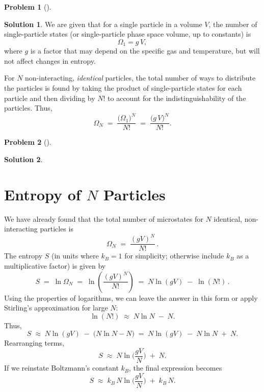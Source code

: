 \documentclass[12pt]{article}
\title{}
\author{Jerich Lee}
\date{\today}
\theoremstyle{definition} %
\newtheorem{solution}{Solution}
\newtheorem{problem}{Problem}
\theoremstyle{plain} %
\begin{document}
\maketitle
\begin{problem}[]
    
\end{problem}
\begin{solution}
   
We are given that for a single particle in a volume \(V\), the number of single-particle states (or single-particle phase space volume, up to constants) is
\[
\Omega_1 = g\,V,
\]
where \(g\) is a factor that may depend on the specific gas and temperature, but will not affect changes in entropy.

For \(N\) non-interacting, \emph{identical} particles, the total number of ways to distribute the particles is found by taking the product of single-particle states for each particle and then dividing by \(N!\) to account for the indistinguishability of the particles. Thus,
\[
\Omega_N \;=\; \frac{\bigl(\Omega_1\bigr)^N}{N!} \;=\; \frac{\bigl(g\,V\bigr)^N}{N!}.
\]
 
\end{solution}
\begin{problem}[]
    
\end{problem}
\begin{solution}
    \section*{Entropy of $N$ Particles}

We have already found that the total number of microstates for $N$ 
identical, non-interacting particles is
\[
\Omega_N \;=\; \frac{(gV)^N}{N!}\,.
\]
The entropy $S$ (in units where $k_B=1$ for simplicity; otherwise 
include $k_B$ as a multiplicative factor) is given by
\[
S \;=\; \ln \Omega_N \;=\; \ln \left(\frac{(gV)^N}{N!}\right)
\;=\; N \ln(gV) \;-\; \ln(N!)\,.
\]
Using the properties of logarithms, we can leave the answer in this form or 
apply Stirling's approximation for large $N$:
\[
\ln(N!) \;\approx\; N \ln N \;-\; N.
\]
Thus,
\[
S \;\approx\; N \ln(gV) \;-\; \bigl(N \ln N - N\bigr) 
\;=\; N \ln(gV) \;-\; N \ln N \;+\; N.
\]
Rearranging terms,
\[
S \;\approx\; N \ln\!\biggl(\frac{gV}{N}\biggr) \;+\; N.
\]
If we reinstate Boltzmann's constant $k_B$, the final expression becomes
\[
S \;\approx\; k_B \, N \ln\!\biggl(\frac{gV}{N}\biggr) 
\;+\; k_B \, N.
\]
\end{solution}
\end{document}
